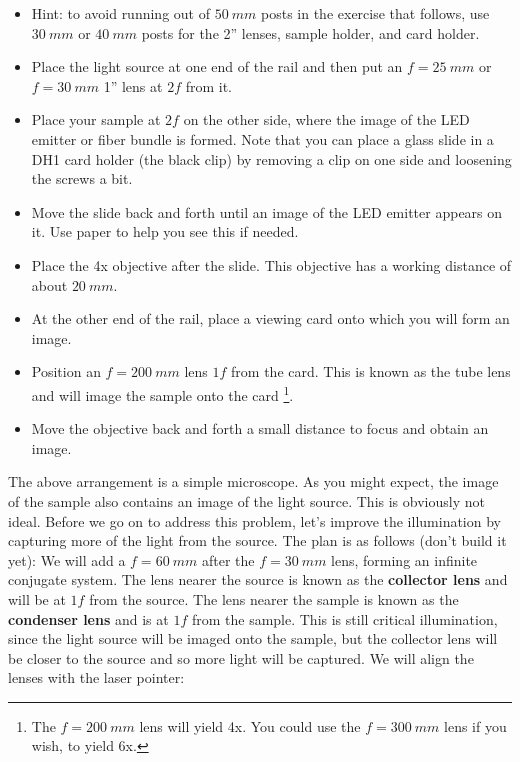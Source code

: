 \documentclass[a4paper]{report}
\begin{document}
\begin{itemize}
\item Hint: to avoid running out of $50~mm$ posts in the exercise that follows, use $30~mm$ or $40~mm$ posts for the 2'' lenses, sample holder, and card holder.
\item Place the light source at one end of the rail and then put an $f=25~mm$ or $f=30~mm$ 1'' lens at $2f$ from it.
\item Place your sample at $2f$ on the other side, where the image of the LED emitter or fiber bundle is formed.
Note that you can place a glass slide in a DH1 card holder (the black clip) by removing a clip on one side and loosening the screws a bit.
\item Move the slide back and forth until an image of the LED emitter appears on it. Use paper to help you see this if needed.
\item Place the 4x objective after the slide. This objective has a working distance of about $20~mm$.
\item At the other end of the rail, place a viewing card onto which you will form an image.
\item Position an $f=200~mm$ lens $1f$ from the card. This is known as the tube lens and will image the sample onto the card
\footnote{The $f=200~mm$ lens will yield 4x. You could use the $f=300~mm$ lens if you wish, to yield 6x.}.
\item Move the objective back and forth a small distance to focus and obtain an image. 
\end{itemize}

The above arrangement is a simple microscope. 
As you might expect, the image of the sample also contains an image of the light source. 
This is obviously not ideal.
Before we go on to address this problem, let's improve the illumination by capturing more of the light from the source. 
The plan is as follows (don't build it yet):
We will add a $f=60~mm$ after the $f=30~mm$ lens, forming an infinite conjugate system. 
The lens nearer the source is known as the \textbf{collector lens} and will be at $1f$ from the source.
The lens nearer the sample is known as the \textbf{condenser lens} and is at $1f$ from the sample. 
This is still critical illumination, since the light source will be imaged onto the sample, but the collector lens will be closer to the source and so more light will be captured. We will align the lenses with the laser pointer:
\end{document}
